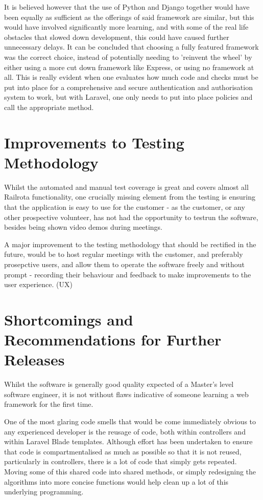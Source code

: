 It is believed however that the use of Python and Django together would have been equally as sufficient as the offerings of said framework are similar, but this would have involved significantly more learning, and with some of the real life obstacles that slowed down development, this could have caused further unnecessary delays. It can be concluded that choosing a fully featured framework was the correct choice, instead of potentially needing to 'reinvent the wheel' by either using a more cut down framework like Express, or using no framework at all. This is really evident when one evaluates how much code and checks must be put into place for a comprehensive and secure authentication and authorisation system to work, but with Laravel, one only needs to put into place policies and call the appropriate method. \cite{Laravel8}

\section{Improvements to Testing Methodology}
Whilst the automated and manual test coverage is great and covers almost all Railrota functionality, one crucially missing element from the testing is ensuring that the application is easy to use for the customer - as the customer, or any other prospective volunteer, has not had the opportunity to testrun the software, besides being shown video demos during meetings.

A major improvement to the testing methodology that should be rectified in the future, would be to host regular meetings with the customer, and preferably prosepctive users, and allow them to operate the software freely and without prompt - recording their behaviour and feedback to make improvements to the user experience. (UX)

\section{Shortcomings and Recommendations for Further Releases}
Whilst the software is generally good quality expected of a Master's level software engineer, it is not without flaws indicative of someone learning a web framework for the first time.

One of the most glaring code smells that would be come immediately obvious to any experienced developer is the reusage of code, both within controllers and within Laravel Blade templates. Although effort has been undertaken to ensure that code is compartmentalised as much as possible so that it is not reused, particularly in controllers, there is a lot of code that simply gets repeated. Moving some of this shared code into shared methods, or simply redesigning the algorithms into more concise functions would help clean up a lot of this underlying programming.

